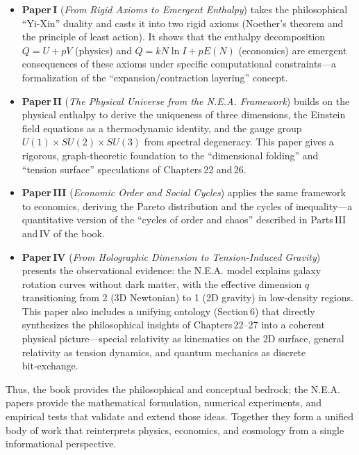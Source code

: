 \documentclass[12pt,a4paper]{article}
\begin{document}
\begin{itemize}
    \item \textbf{Paper I} (\textit{From Rigid Axioms to Emergent Enthalpy}) takes the philosophical “Yi-Xin” duality and casts it into two rigid axioms (Noether’s theorem and the principle of least action). It shows that the enthalpy decomposition \(Q = U + pV\) (physics) and \(Q = k N \ln I + pE(N)\) (economics) are emergent consequences of these axioms under specific computational constraints—a formalization of the “expansion/contraction layering” concept.
    \item \textbf{Paper II} (\textit{The Physical Universe from the N.E.A. Framework}) builds on the physical enthalpy to derive the uniqueness of three dimensions, the Einstein field equations as a thermodynamic identity, and the gauge group \(U(1) \times SU(2) \times SU(3)\) from spectral degeneracy. This paper gives a rigorous, graph‑theoretic foundation to the “dimensional folding” and “tension surface” speculations of Chapters 22 and 26.
    \item \textbf{Paper III} (\textit{Economic Order and Social Cycles}) applies the same framework to economics, deriving the Pareto distribution and the cycles of inequality—a quantitative version of the “cycles of order and chaos” described in Parts III and IV of the book.
    \item \textbf{Paper IV} (\textit{From Holographic Dimension to Tension-Induced Gravity}) presents the observational evidence: the N.E.A. model explains galaxy rotation curves without dark matter, with the effective dimension \(q\) transitioning from 2 (3D Newtonian) to 1 (2D gravity) in low‑density regions. This paper also includes a unifying ontology (Section 6) that directly synthesizes the philosophical insights of Chapters 22–27 into a coherent physical picture—special relativity as kinematics on the 2D surface, general relativity as tension dynamics, and quantum mechanics as discrete bit‑exchange.
\end{itemize}

Thus, the book provides the philosophical and conceptual bedrock; the N.E.A. papers provide the mathematical formulation, numerical experiments, and empirical tests that validate and extend those ideas. Together they form a unified body of work that reinterprets physics, economics, and cosmology from a single informational perspective.
\end{document}
